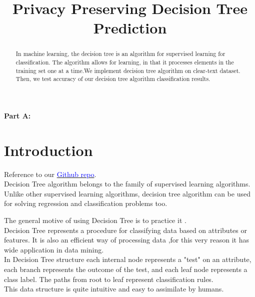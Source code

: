 \documentclass[conference,compsoc]{IEEEtran}
\begin{document}
\title{Privacy Preserving Decision Tree Prediction}

\author{
}

\maketitle
\textbf{\large{Part A:}}
\tableofcontents

\newpage
\begin{abstract}
In machine learning, the decision tree is an algorithm for supervised learning for classification. The algorithm allows for learning, in that it processes elements in the training set one at a time.We implement decision tree algorithm on clear-text dataset. Then, we test accuracy of our decision tree algorithm classification results. \\

\end{abstract}


\section{Introduction}

Reference to our \href{https://github.com/assiakhateeb/PPML_lab/tree/main/Part\%20A}{\textcolor{blue}{Github repo}}.\\
Decision Tree algorithm belongs to the family of supervised learning algorithms. Unlike other supervised learning algorithms, decision tree algorithm can be used for solving regression and classification problems too.

The general motive of using Decision Tree is to practice it .\\
Decision Tree represents a procedure for classifying data based on attributes or features. It is also an efficient way of processing data ,for this very reason it has wide application in data mining.\\
In Decision Tree structure each internal node represents a "test" on an attribute, each branch represents the outcome of the test, and each leaf node represents a class label. The paths from root to leaf represent classification rules.\\
This data structure is quite intuitive and easy to assimilate by humans.
\end{document}
